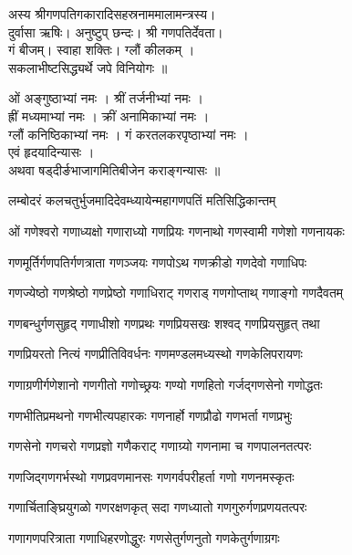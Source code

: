 

अस्य श्रीगणपतिगकारादिसहस्रनाममालामन्त्रस्य।\\
दुर्वासा ऋषिः। अनुष्टुप् छन्दः। श्री गणपतिर्देवता।\\
गं बीजम्। स्वाहा शक्तिः। ग्लौं कीलकम् ।\\
 सकलाभीष्टसिद्ध्यर्थे जपे विनियोगः ॥

ओं अङ्गुष्ठाभ्यां नमः । श्रीं तर्जनीभ्यां नमः ।\\
ह्रीं मध्यमाभ्यां नमः । क्रीं अनामिकाभ्यां नमः ।\\
 ग्लौं कनिष्ठिकाभ्यां नमः । गं करतलकरपृष्ठाभ्यां नमः ।\\
 एवं हृदयादिन्यासः । \\
अथवा षड्दीर्ङभाजागमितिबीजेन कराङ्गन्यासः ॥

{लम्बोदरं कलचतुर्भुजमादिदेवम्}{ध्यायेन्महागणपतिं मतिसिद्धिकान्तम्}


\twolineshloka
{ओं गणेश्वरो गणाध्यक्षो गणाराध्यो गणप्रियः}
{गणनाथो गणस्वामी गणेशो गणनायकः}%

\twolineshloka
{गणमूर्तिर्गणपतिर्गणत्राता गणञ्जयः}%
{गणपोऽथ गणक्रीडो गणदेवो गणाधिपः}%

\twolineshloka
{गणज्येष्ठो गणश्रेष्ठो गणप्रेष्ठो गणाधिराट्}%
{गणराड् गणगोप्ताथ् गणाङ्गो गणदैवतम्}%

\twolineshloka
{गणबन्धुर्गणसुहृद् गणाधीशो गणप्रथः}%
{गणप्रियसखः शश्वद् गणप्रियसुहृत् तथा}%

\twolineshloka
{गणप्रियरतो नित्यं गणप्रीतिविवर्धनः}%
{गणमण्डलमध्यस्थो गणकेलिपरायणः}%

\twolineshloka
{गणाग्रणीर्गणेशानो गणगीतो गणोच्छ्रयः}%
{गण्यो गणहितो गर्जद्गणसेनो गणोद्धतः}%

\twolineshloka
{गणभीतिप्रमथनो गणभीत्यपहारकः}%
{गणनार्हो गणप्रौढो गणभर्ता गणप्रभुः}%

\twolineshloka
{गणसेनो गणचरो गणप्रज्ञो गणैकराट्}%
{गणाग्र्यो गणनामा च गणपालनतत्परः}%

\twolineshloka
{गणजिद्गणगर्भस्थो गणप्रवणमानसः}%
{गणगर्वपरीहर्ता गणो गणनमस्कृतः}%

\twolineshloka
{गणार्चिताङ्घ्रियुगळो गणरक्षणकृत् सदा}%
{गणध्यातो गणगुरुर्गणप्रणयतत्परः}%

\twolineshloka
{गणागणपरित्राता गणाधिहरणोद्धुरः}%
{गणसेतुर्गणनुतो गणकेतुर्गणाग्रगः}%

